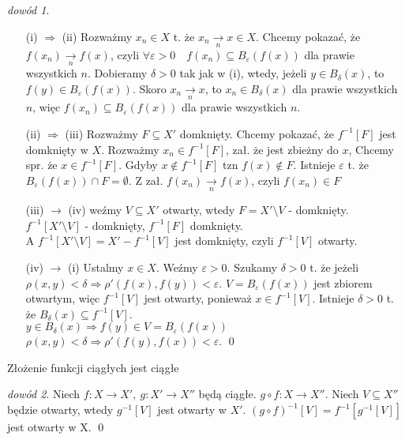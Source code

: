 \documentclass[twoside,10pt]{article}
\theoremstyle{definition}
\theoremstyle{definition}
\theoremstyle{definition}
\theoremstyle{definition}
\theoremstyle{remark}
\newtheorem*{dd}{dowód}
\theoremstyle{definition}
\theoremstyle{definition}
\theoremstyle{definition}
\theoremstyle{definition}
\theoremstyle{definition}
\theoremstyle{definition}
\begin{document}
\begin{dd} \hfill 
    \begin{itemize} 
        \item[(i) $\Rightarrow$ (ii)] Rozważmy $x_n \in X$ t. że $x_n \underset{n}{\rightarrow} x \in X$. 
        Chcemy pokazać, że $f(x_n) \underset{n}{\rightarrow} f(x)$, czyli $\forall \varepsilon > 0 \quad f(x_n) \subseteq B_\varepsilon (f(x))$ dla prawie wszystkich $n$.
        Dobieramy $\delta > 0$ tak jak w (i), wtedy, jeżeli $y \in B_\delta(x)$, to $f(y) \in B_\varepsilon (f(x))$. Skoro $x_n \underset{n}{\rightarrow} x$, 
        to $x_n \in B_\delta (x)$ dla prawie wszystkich $n$, więc $f(x_n) \subseteq B_\varepsilon (f(x))$ dla prawie wszystkich $n$.
        \item[(ii) $\Rightarrow$ (iii)] Rozważmy $F \subseteq X'$ domknięty. Chcemy pokazać, że $f^{-1}[F]$ jest domknięty w $X$. Rozważmy $x_n \in f^{-1}[F]$, zał. że jest zbieżny do $x$, Chcemy spr. że $x \in f^{-1}[F]$.
        Gdyby $x \notin f^{-1}[F]$ tzn $f(x) \notin F$. Istnieje $\varepsilon$ t. że $B_\varepsilon (f(x)) \cap F = \emptyset$. 
        Z zał. $f(x_n) \underset{n}{\rightarrow} f(x)$, czyli $f(x_n) \in F$ \lightning
        \item[(iii) $\rightarrow$ (iv)] weźmy $V \subseteq X'$ otwarty, wtedy $F = X' \setminus V$ - domknięty. $ f^{-1} [X' \setminus V]$ - domknięty, $f^{-1}[F]$ domknięty. \\
        A $f^{-1}[X' \setminus V] = X' - f^{-1}[V]$ jest domknięty, czyli $f^{-1}[V]$ otwarty. \lightning
        \item[(iv) $\rightarrow$ (i)] Ustalmy $x \in X$. Weźmy $\varepsilon > 0$. Szukamy $\delta > 0$ t. że jeżeli $\rho (x,y) < \delta \Rightarrow \rho ' (f(x),f(y)) < \varepsilon$.
        $ V = B_\varepsilon (f(x))$ jest zbiorem otwartym, więc $f^{-1}[V]$ jest otwarty, ponieważ $x \in f^{-1}[V]$.
        Istnieje $\delta > 0$ t. że $B_\delta (x) \subseteq f^{-1}[V]$. \\
        $y \in B_\delta (x) \Rightarrow f(y) \in V = B_\varepsilon (f(x))$\\
        $\rho (x,y) < \delta \Rightarrow \rho'(f(y),f(x)) < \varepsilon$. \hfill \qed
    \end{itemize} 
\end{dd} 

\begin{tw} Złożenie funkcji ciągłych jest ciągłe \end{tw}
\begin{dd} 
    Niech $f: X \rightarrow X', \ g: X' \rightarrow X''$ będą ciągłe. $g \circ f: X \rightarrow X''$. Niech $V \subseteq X''$ będzie otwarty, wtedy $g^{-1}[V]$ jest otwarty w $X'$.
    $(g \circ f)^{-1}[V] = f^{-1}[g^{-1}[V]]$ jest otwarty w X. \hfill \qed
\end{dd} 
\end{document}
